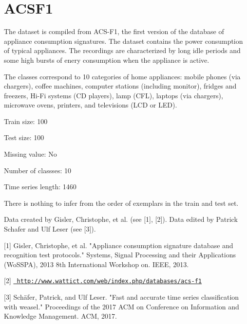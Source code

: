 \chapter{ACSF1}
\hypertarget{md_external_2data_2UCRArchive__2018_2ACSF1_2README}{}\label{md_external_2data_2UCRArchive__2018_2ACSF1_2README}
\label{md_external_2data_2UCRArchive__2018_2ACSF1_2README_autotoc_md0}%
%
 The dataset is compiled from ACS-\/\+F1, the first version of the database of appliance consumption signatures. The dataset contains the power consumption of typical appliances. The recordings are characterized by long idle periods and some high bursts of enery consumption when the appliance is active.

The classes correspond to 10 categories of home appliances\+: mobile phones (via chargers), coffee machines, computer stations (including monitor), fridges and freezers, Hi-\/\+Fi systems (CD players), lamp (CFL), laptops (via chargers), microwave ovens, printers, and televisions (LCD or LED).

Train size\+: 100

Test size\+: 100

Missing value\+: No

Number of classses\+: 10

Time series length\+: 1460

There is nothing to infer from the order of exemplars in the train and test set.

Data created by Gisler, Christophe, et al. (see \mbox{[}1\mbox{]}, \mbox{[}2\mbox{]}). Data edited by Patrick Schafer and Ulf Leser (see \mbox{[}3\mbox{]}).

\mbox{[}1\mbox{]} Gisler, Christophe, et al. "{}\+Appliance consumption signature database and recognition test protocols."{} Systems, Signal Processing and their Applications (Wo\+SSPA), 2013 8th International Workshop on. IEEE, 2013.

\mbox{[}2\mbox{]} \href{http://www.wattict.com/web/index.php/databases/acs-f1}{\texttt{ http\+://www.\+wattict.\+com/web/index.\+php/databases/acs-\/f1}}

\mbox{[}3\mbox{]} Schäfer, Patrick, and Ulf Leser. "{}\+Fast and accurate time series classification with weasel."{} Proceedings of the 2017 ACM on Conference on Information and Knowledge Management. ACM, 2017. 